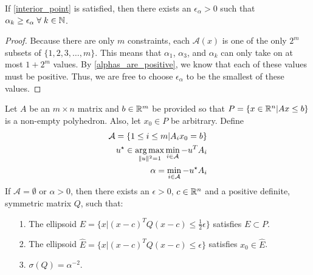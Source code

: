 \begin{lemma}
\label{alphas_are_bounded}
If \cref{interior_point} is satisfied, then there exists an  $\epsilon_{\alpha} > 0$ such that $\alpha_k \ge \epsilon_{\alpha} \; \forall \; k \in \mathbb N$.
\end{lemma}
\begin{proof}
Because there are only $m$ constraints, each $\mathcal A(x)$ is one of the only $2^m$ subsets of  $\{1, 2, 3, \ldots, m\}$.
This means that $\alpha_1$, $\alpha_3$, and $\alpha_k$ can only take on at most $1 + 2^m$ values.
By \cref{alphas_are_positive}, we know that each of these values must be positive.
Thus, we are free to choose $\epsilon_{\alpha}$ to be the smallest of these values.
\end{proof}

\begin{lemma}
\label{ellipsoid_exists}
Let  $A$ be an $m \times n$ matrix and $b \in \mathbb R^m$ be provided so that $P = \{x \in \mathbb R^n | Ax \le b \}$ is a non-empty polyhedron.
Also, let $x_0 \in P$ be arbitrary.
Define
\begin{align}
\mathcal A = \{1 \le i \le m | A_i x_0 = b \} \label{active_polyhedron_constraints} \\
u^{\star} \in \operatorname*{arg\,max}_{\|u\|^2 = 1} \min_{i \in \mathcal A} - u^T A_i \label{polyhedrons_u} \\
\alpha = \min_{i \in \mathcal A} -u^{\star}A_i \label{polyhedrons_alpha}
\end{align}
If $\mathcal A = \emptyset$ or $\alpha > 0$, then there exists an $\epsilon > 0$, $c \in \mathbb R^n$  and a positive definite, symmetric matrix $Q$, 
such that:
\begin{itemize}
\item[1.] The ellipsoid $E = \{x | (x - c)^TQ(x - c) \le \frac 1 2 \epsilon \}$ satisfies $E \subset P$.
\item[2.] The ellipsoid $\hat E = \{x | (x - c)^TQ(x - c) \le  \epsilon \}$ satisfies $x_0 \in \hat E$.
\item[3.] $\sigma(Q) = \alpha^{-2}$.
\end{itemize}
\end{lemma}

